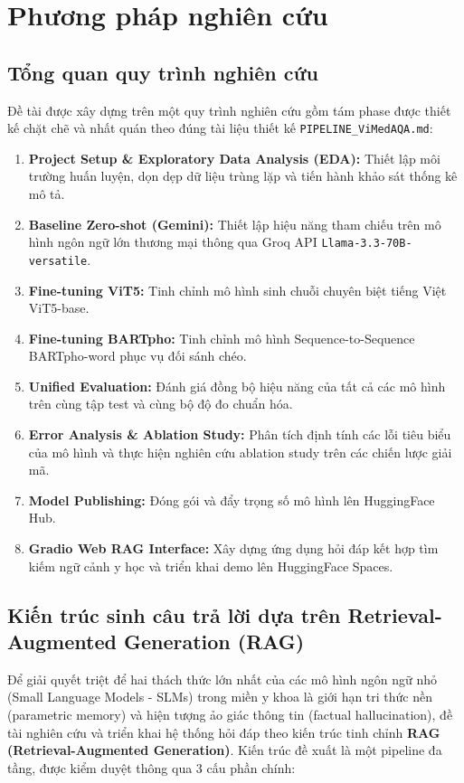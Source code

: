 \chapter{Phương pháp nghiên cứu}
\section{Tổng quan quy trình nghiên cứu}
Đề tài được xây dựng trên một quy trình nghiên cứu gồm tám phase được thiết kế chặt chẽ và nhất quán theo đúng tài liệu thiết kế \texttt{PIPELINE\_ViMedAQA.md}:
\begin{enumerate}
    \item \textbf{Project Setup \& Exploratory Data Analysis (EDA):} Thiết lập môi trường huấn luyện, dọn dẹp dữ liệu trùng lặp và tiến hành khảo sát thống kê mô tả.
    \item \textbf{Baseline Zero-shot (Gemini):} Thiết lập hiệu năng tham chiếu trên mô hình ngôn ngữ lớn thương mại thông qua Groq API \texttt{Llama-3.3-70B-versatile}.
    \item \textbf{Fine-tuning ViT5:} Tinh chỉnh mô hình sinh chuỗi chuyên biệt tiếng Việt ViT5-base.
    \item \textbf{Fine-tuning BARTpho:} Tinh chỉnh mô hình Sequence-to-Sequence BARTpho-word phục vụ đối sánh chéo.
    \item \textbf{Unified Evaluation:} Đánh giá đồng bộ hiệu năng của tất cả các mô hình trên cùng tập test và cùng bộ độ đo chuẩn hóa.
    \item \textbf{Error Analysis \& Ablation Study:} Phân tích định tính các lỗi tiêu biểu của mô hình và thực hiện nghiên cứu ablation study trên các chiến lược giải mã.
    \item \textbf{Model Publishing:} Đóng gói và đẩy trọng số mô hình lên HuggingFace Hub.
    \item \textbf{Gradio Web RAG Interface:} Xây dựng ứng dụng hỏi đáp kết hợp tìm kiếm ngữ cảnh y học và triển khai demo lên HuggingFace Spaces.
\end{enumerate}

\section{Kiến trúc sinh câu trả lời dựa trên Retrieval-Augmented Generation (RAG)}
Để giải quyết triệt để hai thách thức lớn nhất của các mô hình ngôn ngữ nhỏ (Small Language Models - SLMs) trong miền y khoa là giới hạn tri thức nền (parametric memory) và hiện tượng ảo giác thông tin (factual hallucination), đề tài nghiên cứu và triển khai hệ thống hỏi đáp theo kiến trúc tinh chỉnh \textbf{RAG (Retrieval-Augmented Generation)}. Kiến trúc đề xuất là một pipeline đa tầng, được kiểm duyệt thông qua 3 cấu phần chính:

